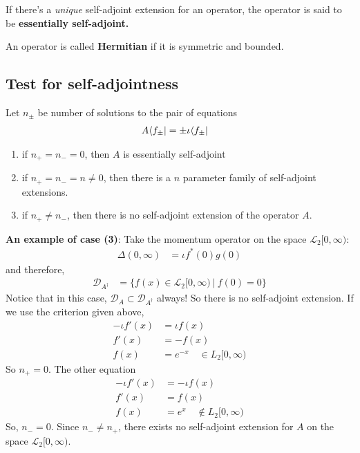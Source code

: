If there's a \emph{unique} self-adjoint extension for an operator, the operator is said to be \textbf{essentially self-adjoint.}

An operator is called \textbf{Hermitian} if it is symmetric and bounded.

\subsection*{Test for self-adjointness}

Let $n_\pm$ be number of solutions to the pair of equations
\begin{align*}
    A \langle f_\pm | &= \pm \iota \langle f_\pm |
\end{align*}
\begin{enumerate}
    \item 
        if $n_+ = n_- = 0$, then $A$ is essentially self-adjoint
    \item
        if $n_+ = n_- =n \neq 0$, then there is a $n$ parameter family of self-adjoint extensions.
    \item
        if $n_+ \neq n_- $, then there is no self-adjoint extension of the operator $A$.
\end{enumerate}

\textbf{An example of case (3)}: Take the momentum operator on the space $\mathcal L_2 [0, \infty)$:
\begin{align*}
    \Delta(0,\infty) &= \iota f^*(0)g(0)
\end{align*}
and therefore,
\begin{align*}
    \mathcal D_{A^\dagger} &= \{f(x)\in \mathcal L_2[0,\infty)\ |\ f(0)=0\}
\end{align*}
Notice that in this case, $\mathcal D_A \subset \mathcal D_{A^\dagger}$ always! So there is no self-adjoint extension.
If we use the criterion given above,
\begin{align*}
    -\iota f'(x) &= \iota f(x) \\
    f'(x) &= - f(x) \\
    f(x) &= e^{-x}\quad \in L_2 [0,\infty)
\end{align*}
So $n_+ = 0$. The other equation
\begin{align*}
    -\iota f'(x) &= -\iota f(x) \\
    f'(x) &= f(x) \\
    f(x) &= e^{x}\quad \not\in L_2 [0,\infty)
\end{align*}
So, $n_- = 0$. Since $n_- \neq n_+$, there exists no self-adjoint extension for $A$ on the space $\mathcal L_2 [0, \infty)$.

